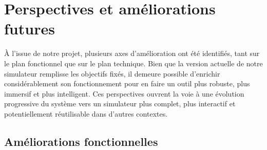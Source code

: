 
\section{Perspectives et améliorations futures}

À l’issue de notre projet, plusieurs axes d’amélioration ont été identifiés, tant sur le plan fonctionnel que sur le plan technique. Bien que la version actuelle de notre simulateur remplisse les objectifs fixés, il demeure possible d’enrichir considérablement son fonctionnement pour en faire un outil plus robuste, plus immersif et plus intelligent. Ces perspectives ouvrent la voie à une évolution progressive du système vers un simulateur plus complet, plus interactif et potentiellement réutilisable dans d'autres contextes.

\subsection{Améliorations fonctionnelles}

